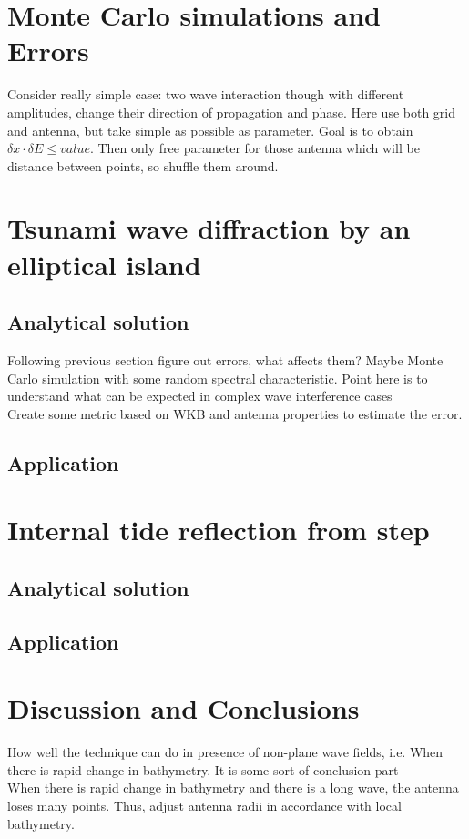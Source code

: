 \section{Monte Carlo simulations and Errors}
Consider really simple case: two wave interaction though with different amplitudes, change their direction of propagation and phase. Here use both grid and antenna, but take simple as possible as parameter. Goal is to obtain $\delta x \cdot \delta E \leq value$. Then only free parameter for those antenna which will be distance between points, so shuffle them around.

\section{Tsunami wave diffraction by an elliptical island}
\subsection{Analytical solution}
Following previous section figure out errors, what affects them? Maybe Monte Carlo simulation with some random spectral characteristic. Point here is to understand what can be expected in complex wave interference cases\\
Create some metric based on WKB and antenna properties to estimate the error.
\subsection{Application}

\section{Internal tide reflection from step}
\subsection{Analytical solution}
\subsection{Application}

\section{Discussion and Conclusions}
How well the technique can do in presence of non-plane wave fields, i.e. When there is rapid change in bathymetry. It is some sort of conclusion part\\
When there is rapid change in bathymetry and there is a long wave, the antenna loses many points. Thus, adjust antenna radii in accordance with local bathymetry.

